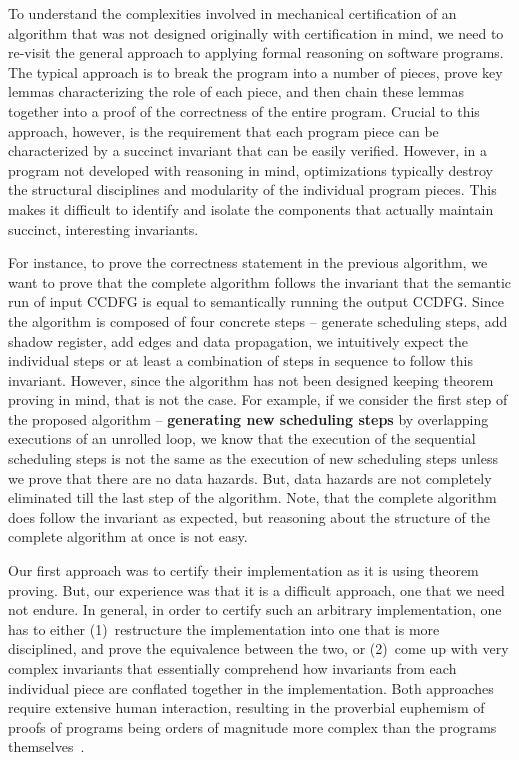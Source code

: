 To understand the complexities involved in mechanical
certification of an algorithm that was not designed
originally with certification in mind, we need to re-visit
the general approach to applying formal reasoning on
software programs.  The typical approach is to break the
program into a number of pieces, prove key lemmas
characterizing the role of each piece, and then chain these
lemmas together into a proof of the correctness of the
entire program. Crucial to this approach, however, is the
requirement that each program piece can be characterized by
a succinct invariant that can be easily verified.  However,
in a program not developed with reasoning in mind,
optimizations typically destroy the structural disciplines
and modularity of the individual program pieces. This makes it
difficult to identify and isolate the components that
actually maintain succinct, interesting invariants.

For instance, to prove the correctness statement in the previous algorithm, 
we want to prove that the complete algorithm follows
the invariant that the semantic run of input CCDFG is equal to semantically running the output CCDFG.
Since the algorithm is composed of four concrete steps -- generate scheduling steps, add shadow register,
add edges and data propagation, we intuitively expect the individual steps or at least a combination of steps in sequence to
follow this invariant. However, since the algorithm has not been designed keeping theorem proving
in mind, that is not the case. For example, if
we consider the first step of the proposed algorithm -- {\bf generating new scheduling steps} by
overlapping executions of an unrolled loop, we know that the execution 
of the sequential scheduling steps is not the same as the execution of new scheduling steps
unless we prove that there are no data hazards. But, data hazards are not completely eliminated till the last step of the algorithm. Note, that the complete algorithm does follow the invariant as expected, but reasoning about the structure of the
complete algorithm at once is not easy.

Our first approach was to certify their implementation as it is using theorem proving. 
But, our experience was that it is a difficult approach, one that we need not endure.
In general, in order to certify such an arbitrary implementation,
one has to either (1)~restructure the implementation into
one that is more disciplined, and prove the equivalence
between the two, or (2)~come up with very complex
invariants that essentially comprehend how invariants from
each individual piece are conflated together in the
implementation.  Both approaches require extensive human
interaction, resulting in the proverbial euphemism of proofs
of programs being orders of magnitude more complex than the
programs themselves~\cite{liu}.

